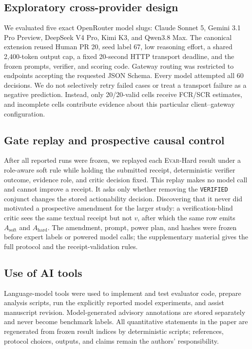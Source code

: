 \documentclass[acmsmall,screen,review,anonymous]{acmart}
\newcommand{\evar}{\textsc{Evar}\xspace}
\begin{document}
\subsection{Exploratory cross-provider design}

We evaluated five exact OpenRouter model slugs: Claude Sonnet 5, Gemini 3.1 Pro Preview, DeepSeek V4 Pro, Kimi K3, and Qwen3.8 Max. The canonical extension reused Human PR 20, seed label 67, low reasoning effort, a shared 2,400-token output cap, a fixed 20-second HTTP transport deadline, and the frozen prompts, verifier, and scoring code. Gateway routing was restricted to endpoints accepting the requested JSON Schema. Every model attempted all 60 decisions. We do not selectively retry failed cases or treat a transport failure as a negative prediction. Instead, only 20/20-valid cells receive FCR/SCR estimates, and incomplete cells contribute evidence about this particular client--gateway configuration.

\subsection{Gate replay and prospective causal control}

After all reported runs were frozen, we replayed each \evar-Hard result under a role-aware soft rule while holding the submitted receipt, deterministic verifier outcome, evidence role, and critic decision fixed. This replay makes no model call and cannot improve a receipt. It asks only whether removing the \texttt{VERIFIED} conjunct changes the stored actionability decision. Discovering that it never did motivated a prospective amendment for the larger study: a verification-blind critic sees the same textual receipt but not $v$, after which the same row emits $A_{\mathrm{soft}}$ and $A_{\mathrm{hard}}$. The amendment, prompt, power plan, and hashes were frozen before expert labels or powered model calls; the supplementary material gives the full protocol and the receipt-validation rules.

\subsection{Use of AI tools}

Language-model tools were used to implement and test evaluator code, prepare analysis scripts, run the explicitly reported model experiments, and assist manuscript revision. Model-generated advisory annotations are stored separately and never become benchmark labels. All quantitative statements in the paper are regenerated from frozen result indices by deterministic scripts; references, protocol choices, outputs, and claims remain the authors' responsibility.
\end{document}
